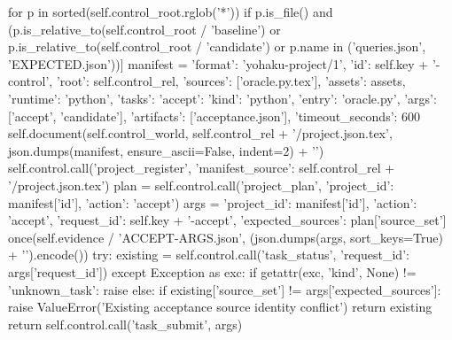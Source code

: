                   for p in sorted(self.control_root.rglob('*')) if p.is_file() and
                  (p.is_relative_to(self.control_root / 'baseline') or p.is_relative_to(self.control_root / 'candidate')
                   or p.name in ('queries.json', 'EXPECTED.json'))]
        manifest = {'format': 'yohaku-project/1', 'id': self.key + '-control', 'root': self.control_rel,
                    'sources': ['oracle.py.tex'], 'assets': assets, 'runtime': 'python',
                    'tasks': {'accept': {'kind': 'python', 'entry': 'oracle.py', 'args': ['accept', 'candidate'],
                                         'artifacts': ['acceptance.json'], 'timeout_seconds': 600}}}
        self.document(self.control_world, self.control_rel + '/project.json.tex', json.dumps(manifest, ensure_ascii=False, indent=2) + '\n')
        self.control.call('project_register', {'manifest_source': self.control_rel + '/project.json.tex'})
        plan = self.control.call('project_plan', {'project_id': manifest['id'], 'action': 'accept'})
        args = {'project_id': manifest['id'], 'action': 'accept', 'request_id': self.key + '-accept',
                'expected_sources': plan['source_set']}
        once(self.evidence / 'ACCEPT-ARGS.json', (json.dumps(args, sort_keys=True) + '\n').encode())
        try:
            existing = self.control.call('task_status', {'request_id': args['request_id']})
        except Exception as exc:
            if getattr(exc, 'kind', None) != 'unknown_task':
                raise
        else:
            if existing['source_set'] != args['expected_sources']:
                raise ValueError('Existing acceptance source identity conflict')
            return existing
        return self.control.call('task_submit', args)

